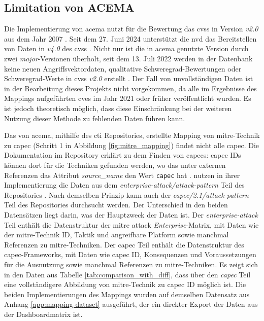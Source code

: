 \subsection{Limitation von ACEMA}
\label{limitationen-acema}
Die Implementierung von \gls{acema} nutzt für die Bewertung das \gls{cvss} in Version \textit{v2.0} aus dem Jahr 2007 \autocite{Acema_oranOCloud_Data_GatheringpyMaster}. Seit dem 27. Juni 2024 unterstützt die \gls{nvd} das Bereitstellen von Daten in \textit{v4.0} des \gls{cvss} \autocite{NVDCVSSV40}. Nicht nur ist die in \gls{acema} genutzte Version durch zwei \textit{major}-Versionen überholt, seit dem 13. Juli 2022 werden in der Datenbank keine neuen Angriffsvektordaten, qualitative Schweregrad-Bewertungen oder Schweregrad-Werte in \gls{cvss} \textit{v2.0} erstellt \autocite{RetirementCVSSV2}. Der Fall von unvollständigen Daten ist in der Bearbeitung dieses Projekts nicht vorgekommen, da alle im Ergebnisse des Mappings aufgeführten \glspl{cve} im Jahr 2021 oder früher veröffentlicht wurden. Es ist jedoch theoretisch möglich, dass diese Einschränkung bei der weiteren Nutzung dieser Methode zu fehlenden Daten führen kann.
%
\par Das von \gls{acema}, mithilfe des \gls{cti} Repositories, erstellte Mapping von \gls{mitre}-Technik zu \gls{capec} (Schritt 1 in Abbildung \ref{fig:mitre_mapping}) findet nicht alle \gls{capec}. Die Dokumentation im Repository erklärt zu dem Finden von \glspl{capec}: \gls{capec} IDs können dort für die Techniken gefunden werden, wo das unter externen Referenzen das Attribut \textit{source\_name} den Wert \verb|capec| hat \autocite{CtiUSAGEmdMaster} \autocite{CtiUSAGECAPECmdMaster}. \citeauthor{klementSecuring6GTransition2024} nutzen in ihrer Implementierung die Daten aus dem \textit{enterprise-attack/attack-pattern} Teil des Repositories \autocite{klement2023acema}. Nach demselben Prinzip kann auch der \textit{capec/2.1/attack-pattern} Teil des Repositories durchsucht werden. Der Unterschied in den beiden Datensätzen liegt darin, was der Hauptzweck der Daten ist. Der \textit{enterprise-attack} Teil enthält die Datenstruktur  der \gls{mitre} \gls{attack} \textit{Enterprise}-Matrix, mit Daten wie der \gls{mitre}-Technik ID, Taktik und angreifbare Platform sowie manchmal Referenzen zu \gls{mitre}-Techniken. Der \gls{capec} Teil enthält die Datenstruktur  des \gls{capec}-Frameworks, mit Daten wie \gls{capec} ID, Konsequenzen und Voraussetzungen für die Ausnutzung sowie manchmal Referenzen zu \gls{mitre}-Techniken. Es zeigt sich in den Daten aus Tabelle \ref{tab:comparison_with_diff}, dass über den \textit{\gls{capec}} Teil eine vollständigere Abbildung von \gls{mitre}-Technik zu \gls{capec} ID möglich ist. Die beiden Implementierungen des Mappings wurden auf demselben Datensatz aus Anhang \ref{app:mapping-dataset} ausgeführt, der ein direkter Export der Daten aus der Dashboardmatrix ist.
%

